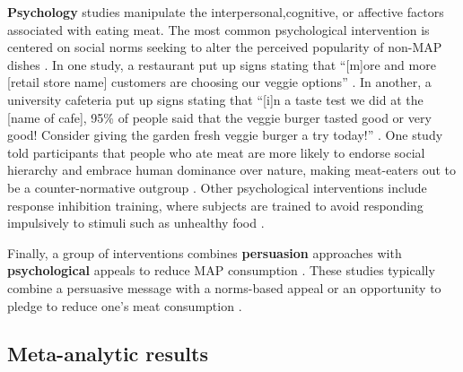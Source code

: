 \documentclass[sn-nature,referee,pdflatex]{sn-jnl}
\begin{document}
\textbf{Psychology} studies
\citep{aldoh2023, allen2002, camp2019, coker2022, piester2020, sparkman2020}
manipulate the interpersonal,cognitive, or affective factors associated
with eating meat. The most common psychological intervention is centered
on social norms seeking to alter the perceived popularity of non-MAP
dishes \citep{sparkman2020}. In one study, a restaurant put up signs
stating that ``{[}m{]}ore and more {[}retail store name{]} customers are
choosing our veggie options'' \citep{coker2022}. In another, a
university cafeteria put up signs stating that ``{[}i{]}n a taste test
we did at the {[}name of cafe{]}, 95\% of people said that the veggie
burger tasted good or very good! Consider giving the garden fresh veggie
burger a try today!'' \citep{piester2020}. One study told participants
that people who ate meat are more likely to endorse social hierarchy and
embrace human dominance over nature, making meat-eaters out to be a
counter-normative outgroup \citep{allen2002}. Other psychological
interventions include response inhibition training, where subjects are
trained to avoid responding impulsively to stimuli such as unhealthy
food \citep{camp2019}.

\begin{comment}
Norms might be descriptive, stating how many people engaged in the desired behavior [@aldoh2023], or dynamic, telling subjects that the number of people reducing their MAP consumption is increasing over time [@aldoh2023; @coker2022; @sparkman2020].
Another study looked at response inhibition training, where subjects are trained to associate meat with an inhibiting response [@camp2019].
The first psychology study meeting our inclusion criteria was published in 2017.
\end{comment}

Finally, a group of interventions combines \textbf{persuasion}
approaches with \textbf{psychological} appeals to reduce MAP consumption
\citep{berndsen2005, bertolaso2015, carfora2023, fehrenbach2015, hennessy2016, mathur2021effectiveness, mattson2020, piester2020, shreedhar2021}.
These studies typically combine a persuasive message with a norms-based
appeal \citep{piester2020, mattson2020} or an opportunity to pledge to
reduce one's meat consumption
\citep{mathur2021effectiveness, shreedhar2021}.

\subsection{Meta-analytic results}\label{meta-analytic-results}
\end{document}
